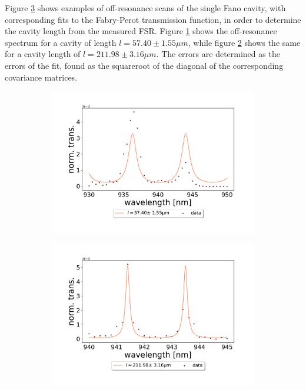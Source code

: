 Figure \ref{fig:single_fano_fsr_scans} shows examples of off-resonance scans of the single Fano cavity, with corresponding fits to the Fabry-Perot transmission function, in order to determine the cavity length from the measured FSR. Figure \ref{fig:short_single_fano_FSR} shows the off-resonance spectrum for a cavity of length $l = 57.40 \pm 1.55 \mu m$, while figure \ref{fig:long_single_fano_FSR} shows the same for a cavity length of $l = 211.98 \pm 3.16 \mu m$. The errors are determined as the errors of the fit, found as the squareroot of the diagonal of the corresponding covariance matrices.

\begin{figure}[h!]
    \centering
    \begin{subfigure}[b]{0.49\textwidth}
        \centering
        \includegraphics[width=\textwidth]{figures/results/single fano fits/60um_off_res_fabry_perot.pdf}
        \caption{}
        \label{fig:short_single_fano_FSR}
    \end{subfigure}
    \begin{subfigure}[b]{0.49\textwidth}
        \centering
        \includegraphics[width=\textwidth]{figures/results/single fano fits/220um_off_res_fabry_perot.pdf}
        \caption{}
        \label{fig:long_single_fano_FSR}
    \end{subfigure}
    \caption{}
    \label{fig:single_fano_fsr_scans}
\end{figure}

